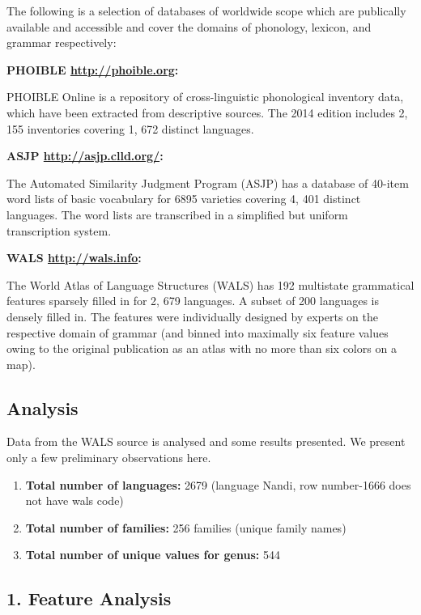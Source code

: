 The following is a selection of databases of worldwide scope which are publically available and accessible and cover the domains of phonology, lexicon, and grammar respectively:

\newpage

\textbf{PHOIBLE \url{http://phoible.org}:}

PHOIBLE Online is a repository of cross-linguistic phonological inventory data, which have been extracted from descriptive sources. The 2014 edition includes 2, 155 inventories covering 1, 672 distinct languages.

\textbf{ASJP \url{http://asjp.clld.org/}:}

The Automated Similarity Judgment Program (ASJP) has a database of 40-item word lists of basic vocabulary for 6895 varieties covering 4, 401 distinct languages. The word lists are transcribed in a simplified but uniform transcription system.

\textbf{WALS \url{http://wals.info}:}

The World Atlas of Language Structures (WALS) has 192 multistate grammatical features sparsely filled in for 2, 679 languages. A subset of 200 languages is densely filled in. The features were individually designed by experts on the respective domain of grammar (and binned into maximally six feature values owing to the original publication as an atlas with no more than six colors on a map).


\subsection*{Analysis}

Data from the WALS source is analysed and some results presented. We present only a few preliminary observations here.

\begin{enumerate}[{\rm 1)}]
\itemsep=0pt
\item \textbf{Total number of languages:} 2679 (language Nandi, row number-1666 does not have wals code)

 \item \textbf{Total number of families:} 256 families (unique family names)

 \item \textbf{Total number of unique values for genus:} 544

\end{enumerate}


\subsection*{1. Feature Analysis}

